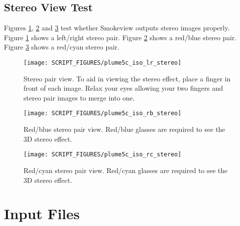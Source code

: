 \documentclass[11pt,twoside]{book}
\begin{document}
\clearpage

\section{Stereo View Test}

Figures \ref{figlrstereo}, \ref{figrbstereo} and  \ref{figrcstereo} test whether Smokeview outputs stereo images properly.  Figure \ref{figlrstereo} shows a left/right stereo pair.  Figure \ref{figrbstereo} shows a red/blue stereo pair.  Figure \ref{figrcstereo} shows a red/cyan stereo pair.

\begin{figure}[bph]
\begin{center}
\texttt{[image: SCRIPT\_FIGURES/plume5c\_iso\_lr\_stereo]}
\caption[Stereo pair view.]{ Stereo
pair view. To aid in viewing the
stereo effect, place a finger in front of each image.  Relax your
eyes allowing your two fingers and stereo pair images to merge
into one. } \label{figlrstereo}
\end{center}
\end{figure}

\begin{figure}[bph]
\begin{center}
\texttt{[image: SCRIPT\_FIGURES/plume5c\_iso\_rb\_stereo]}
\caption[Red/blue stereo pair view.]{
Red/blue stereo pair view. Red/blue
glasses are required to see the 3D stereo effect. }
\label{figrbstereo}
\end{center}
\end{figure}

\begin{figure}[bph]
\begin{center}
\texttt{[image: SCRIPT\_FIGURES/plume5c\_iso\_rc\_stereo]}
\caption[Red/cyan stereo pair view.]{
Red/cyan stereo pair view. Red/cyan
glasses are required to see the 3D stereo effect. }
\label{figrcstereo}
\end{center}
\end{figure}



\appendix
{}

\chapter{Input Files}
\label{fdsinputfiles}
\end{document}

